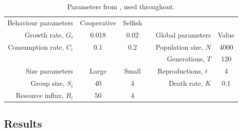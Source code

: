 \documentclass[11pt]{article}
\begin{document}
\begin{table}[!ht]
  \centering
  \begin{tabular}{r|c|ccr|c}
  Behaviour parameters	& Cooperative	& Selfish	&  & \multicolumn{1}{c}{} & \\ \cline{1-3}
  Growth rate, $G_i$			& 0.018			& 0.02		&  & Global parameters	& Value\\ \cline{5-6}
  Consumption rate, $C_i$		& 0.1			& 0.2		&  & Population size, $N$	& 4000\\
  \multicolumn{1}{r}{} & \multicolumn{1}{c}{} & \multicolumn{1}{c}{} &  & Generations, $T$ & 120 \\
  Size parameters		& Large			& Small		&  & Reproductions, $t$~ 		& 4\\ \cline{1-3}
  Group size, $S_i$			& 40			& 4			&  & Death rate, $K$ & 0.1\\
  Resource influx, $R_i$		& 50			& 4			&  & \multicolumn{1}{c}{} & \\
  \end{tabular}
  \caption{Parameters from \cite{orig}, used throughout.}
  \label{table:param}
\end{table}

\subsection{Results}
\end{document}
